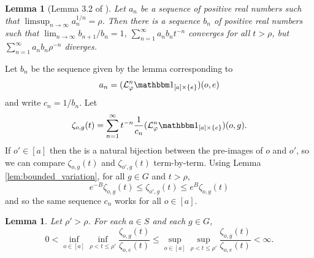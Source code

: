 \documentclass[11pt,letterpaper]{amsart}
\newtheorem{lemma}[theorem]{Lemma}
\theoremstyle{definition}
\numberwithin{equation}{section}
\numberwithin{theorem}{section}
\def\vp{\varphi}
\begin{document}
\begin{lemma}[Lemma 3.2 of \cite{DU}]\label{lem:DU}
Let $a_n$ be a sequence of positive real numbers such that $\limsup_{n \to \infty} a_n^{1/n} =\rho$.
Then there is a sequence $b_n$ of positive real numbers such that $\lim_{n \to \infty} b_{n+1}/b_n=1$,
$\sum_{n=1}^\infty a_nb_nt^{-n}$ converges for all $t > \rho$, but 
$\sum_{n=1}^\infty a_nb_n \rho^{-n}$ diverges.
\end{lemma}

Let $b_n$ be the sequence given by the lemma corresponding
to 
\[
a_n = (\mathcal L_{\vp}^n\mathbbm 1_{[a] \times \{e\}})(o,e)
\] 
and write
$c_n=1/b_n$. Let
\[
\zeta_{o,g}(t) 
= \sum_{n=1}^\infty t^{-n} \frac{1}{c_n} (\mathcal L_{\vp}^n\mathbbm 1_{[a] \times \{e\}})(o,g).
\]
If  $o' \in [a]$ then the is a natural bijection between the pre-images
of $o$ and $o'$, so we can compare $\zeta_{o,g}(t)$ and $\zeta_{o',g}(t)$ term-by-term. 
Using Lemma \ref{lem:bounded_variation}, for all $g \in G$ and $t >\rho$,
\begin{equation}\label{eq:bounds_for_zeta}
e^{-B}  \zeta_{o,g}(t) \le \zeta_{o',g}(t) \le e^B \zeta_{o,g}(t)
\end{equation}
and so the same sequence 
$c_n$ works for all  $o \in [a]$.




\begin{lemma}
Let $\rho'>\rho$.
For each $a \in S$ and each $g \in G$,
\[
0 < \inf_{o \in [a]} \inf_{\rho < t \le \rho'} \frac{\zeta_{o,g}(t)}{\zeta_{o,e}(t)} 
\le \sup_{o \in [a]} \sup_{\rho < t \le \rho'} \frac{\zeta_{o,g}(t)}{\zeta_{o,e}(t)} < \infty.
\]
\end{lemma}
\end{document}
